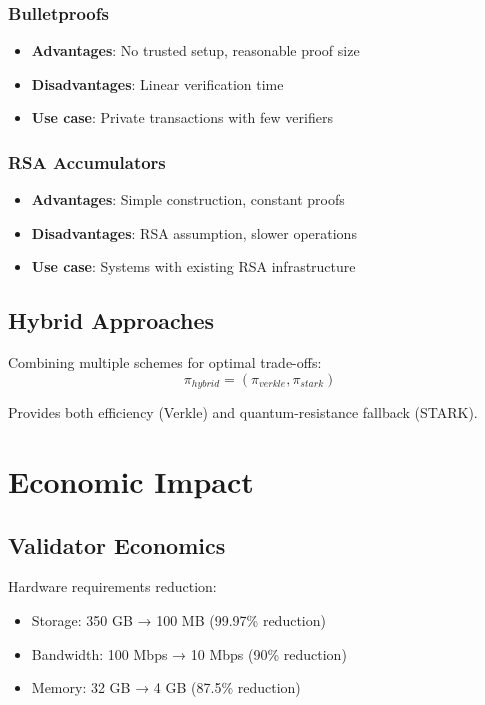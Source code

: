 \documentclass[11pt,a4paper]{article}
\theoremstyle{definition}
\begin{document}
\subsubsection{Bulletproofs}
\begin{itemize}
    \item \textbf{Advantages}: No trusted setup, reasonable proof size
    \item \textbf{Disadvantages}: Linear verification time
    \item \textbf{Use case}: Private transactions with few verifiers
\end{itemize}

\subsubsection{RSA Accumulators}
\begin{itemize}
    \item \textbf{Advantages}: Simple construction, constant proofs
    \item \textbf{Disadvantages}: RSA assumption, slower operations
    \item \textbf{Use case}: Systems with existing RSA infrastructure
\end{itemize}

\subsection{Hybrid Approaches}

Combining multiple schemes for optimal trade-offs:
\begin{equation}
    \pi_{hybrid} = (\pi_{verkle}, \pi_{stark})
\end{equation}

Provides both efficiency (Verkle) and quantum-resistance fallback (STARK).

\section{Economic Impact}

\subsection{Validator Economics}

Hardware requirements reduction:
\begin{itemize}
    \item Storage: 350 GB → 100 MB (99.97\% reduction)
    \item Bandwidth: 100 Mbps → 10 Mbps (90\% reduction)
    \item Memory: 32 GB → 4 GB (87.5\% reduction)
\end{itemize}
\end{document}
